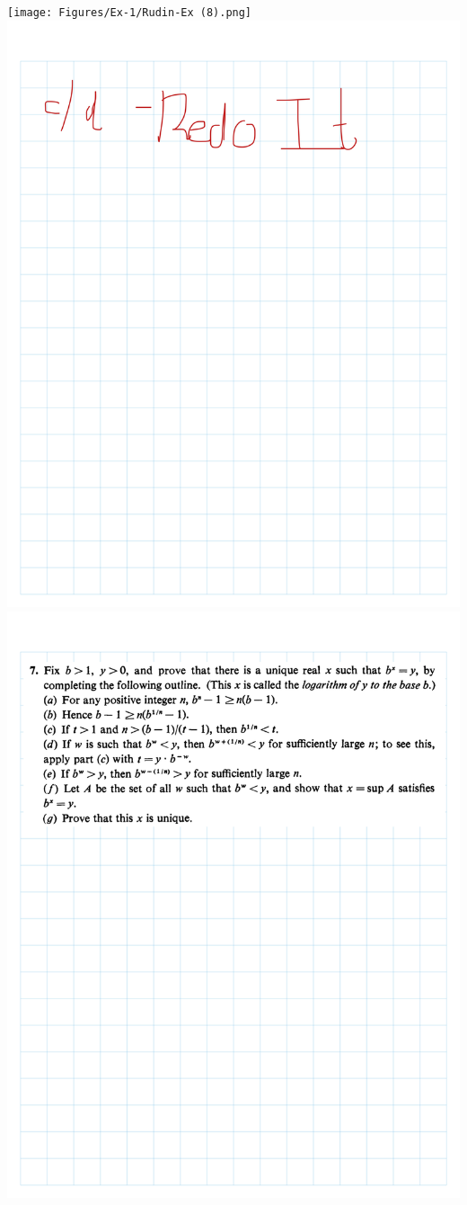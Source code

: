 \documentclass[
]{book}
\theoremstyle{definition}
\theoremstyle{definition}
\theoremstyle{definition}
\theoremstyle{definition}
\theoremstyle{remark}
\begin{document}
\texttt{[image: Figures/Ex-1/Rudin-Ex (8).png]}
\includegraphics{Figures/Ex-1/Rudin-Ex (9).png}
\includegraphics{Figures/Ex-1/Rudin-Ex (10).png}
\end{document}
